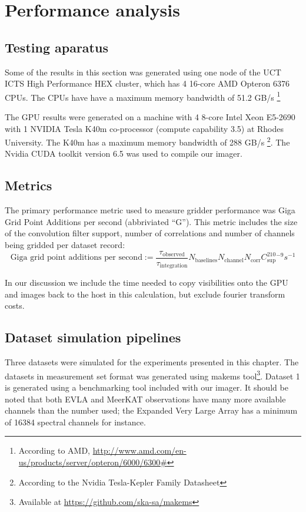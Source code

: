 \chapter{Performance analysis}
\section{Testing aparatus}
Some of the results in this section was generated using one node of the UCT ICTS High Performance HEX cluster, which has 4 16-core AMD Opteron 6376 CPUs. The CPUs
have have a maximum memory bandwidth of 51.2 GB/s \footnote{According to AMD, \url{http://www.amd.com/en-us/products/server/opteron/6000/6300\#}}

The GPU results were generated on a machine with 4 8-core Intel Xeon E5-2690 with 1 NVIDIA Tesla K40m co-processor (compute capability 3.5) at Rhodes University. The K40m has a maximum
memory bandwidth of 288 GB/s \footnote{According to the Nvidia Tesla-Kepler Family Datasheet}. The Nvidia CUDA toolkit version 6.5 was used to compile our imager. 
\section{Metrics}
The primary performance metric used to measure gridder performance was Giga Grid Point Additions per second (abbriviated ``G''). This metric includes the size of the
convolution filter support, number of correlations and number of channels being gridded per dataset record:
\begin{equation}
 \text{Giga grid point additions per second} := \frac{\tau_\text{observed}}{\tau_\text{integration}}N_\text{baselines}N_\text{channel}N_\text{corr}C_\text{sup}^210^{-9}s^{-1}
\end{equation}

In our discussion we include the time needed to copy visibilities onto the GPU and images back to the host in this calculation, but exclude fourier transform costs.
\section{Dataset simulation pipelines}
Three datasets were simulated for the experiments presented in this chapter. The datasets in measurement set format was generated using makems tool\footnote{Available at
\url{https://github.com/ska-sa/makems}}. Dataset 1 is generated using a benchmarking tool included with our imager. It should be noted that both EVLA and MeerKAT observations
have many more available channels than the number used; the Expanded Very Large Array has a minimum of 16384 spectral channels\cite{2041-8205-739-1-L1} for instance.


